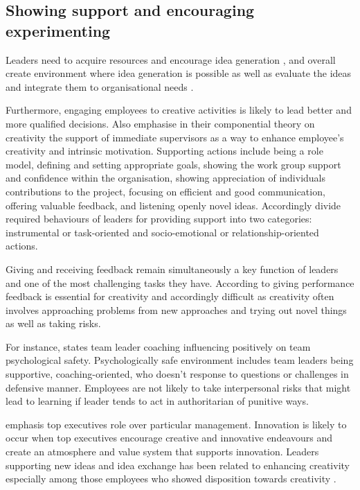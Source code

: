 \subsection{Showing support and encouraging experimenting}
Leaders need to acquire resources and encourage idea generation \citep{mcgourty1996managing}, and overall create environment where idea generation is possible \citep{andrews1970social} as well as evaluate the ideas and integrate them to organisational needs \citep{mumford2002leading}. 

Furthermore, engaging employees to creative activities is likely to lead better and more qualified decisions. \citep{shalley2004leaders}
Also \citep{amabile2004leader} emphasise in their componential theory on creativity the support of immediate supervisors as a way to enhance employee's creativity and intrinsic motivation. Supporting actions include being a role model, defining and setting appropriate goals, showing the work group support and confidence within the organisation, showing appreciation of individuals contributions to the project, focusing on efficient and good communication, offering valuable feedback, and listening openly novel ideas. Accordingly \citep{amabile2004leader} divide required behaviours of leaders for providing support into two categories: instrumental or task-oriented and socio-emotional or relationship-oriented actions.

Giving and receiving feedback remain simultaneously a key function of leaders and one of the most challenging tasks they have. According to \citet{shalley2004leaders} giving performance feedback is essential for creativity and accordingly difficult as creativity often involves approaching problems from new approaches and trying out novel things as well as taking risks. 

For instance, \citet{edmondson1999psychological} states team leader coaching influencing positively on team psychological safety. Psychologically safe environment includes team leaders being supportive, coaching-oriented, who doesn't response to questions or challenges in defensive manner. Employees are not likely to take interpersonal risks that might lead to learning if leader tends to act in authoritarian of punitive ways. 

\citet{quinn1985managing} emphasis top executives role over particular management. Innovation is likely to occur when top executives encourage creative and innovative endeavours and create an atmosphere and value system that supports innovation. Leaders supporting new ideas and idea exchange has been related to enhancing creativity especially among those employees who showed disposition towards creativity \citep{oldham1996employee}.  

